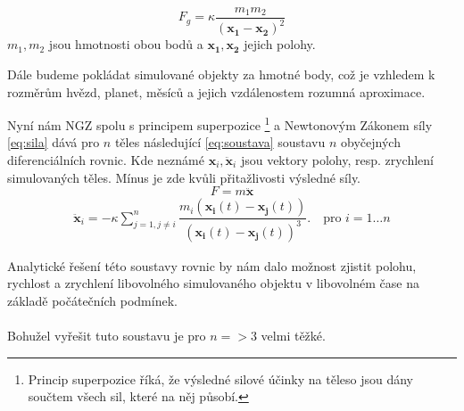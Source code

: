 \begin{equation}
	{F}_g= \kappa \dfrac{m_1 m_2}{(\boldsymbol{x_1 - x_2})^2} 
\end{equation}
$ m_1,m_2 $ jsou hmotnosti obou bodů a $ \boldsymbol{x_1,x_2} $ jejich polohy.

Dále budeme pokládat simulované objekty za hmotné body, což je vzhledem k rozměrům hvězd, planet, měsíců a jejich vzdálenostem rozumná aproximace.

Nyní nám NGZ spolu s principem superpozice
\footnote{Princip superpozice říká, že výsledné silové účinky na těleso jsou dány součtem všech sil, které na něj působí.}
 a Newtonovým Zákonem síly \eqref{eq:sila} dává pro $ n $ těles následující \eqref{eq:soustava} soustavu  $ n $ obyčejných diferenciálních rovnic. 
 Kde neznámé $ \boldsymbol {x}_i, \boldsymbol{\ddot x}_i $ jsou vektory polohy, resp. zrychlení simulovaných těles. Mínus je zde kvůli přitažlivosti výsledné síly.
\begin{equation}
F= m  \boldsymbol {\ddot x}
\label{eq:sila}
\end{equation}
\begin{align}\label{eq:soustava}
\boldsymbol {\ddot x}_i = -\kappa \sum_{j=1,j \neq i}^{n}\dfrac{m_i\left( \boldsymbol{x_i}(t) - \boldsymbol{x_j}(t)\right)}
{\left( \boldsymbol{x_i}(t) - \boldsymbol{x_j}(t)\right) ^3} . 
\quad \text{pro } i=1 \dots n
\end{align}

Analytické řešení této soustavy rovnic by nám dalo možnost zjistit polohu, rychlost a zrychlení libovolného simulovaného objektu v libovolném čase na základě počátečních podmínek.
\paragraph{}
Bohužel vyřešit tuto soustavu je pro $ n=>3 $ velmi těžké.

